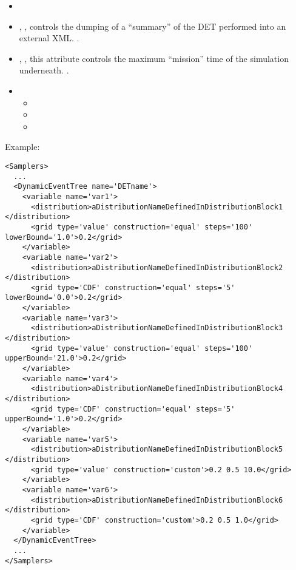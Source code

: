 %
\attrsIntro
\begin{itemize}
  \itemsep0em
  \item \nameDescription
  \item {}, ,
    controls the dumping of a ``summary'' of the DET performed into an external
    XML.
    .
  \item {}, , this
    attribute controls the maximum ``mission'' time of the simulation
    underneath.
    .
\end{itemize}
\begin{itemize}
\item \variableDescription
  \variableChildrenIntro
  \begin{itemize}
    \item \distributionDescription
    \item \functionDescription
    \item \gridDescription
  \end{itemize}
\end{itemize}

Example:
\begin{lstlisting}[style=XML]
<Samplers>
  ...
  <DynamicEventTree name='DETname'>
    <variable name='var1'>
      <distribution>aDistributionNameDefinedInDistributionBlock1 </distribution>
      <grid type='value' construction='equal' steps='100' lowerBound='1.0'>0.2</grid>
    </variable>
    <variable name='var2'>
      <distribution>aDistributionNameDefinedInDistributionBlock2 </distribution>
      <grid type='CDF' construction='equal' steps='5' lowerBound='0.0'>0.2</grid>
    </variable>
    <variable name='var3'>
      <distribution>aDistributionNameDefinedInDistributionBlock3 </distribution>
      <grid type='value' construction='equal' steps='100' upperBound='21.0'>0.2</grid>
    </variable>
    <variable name='var4'>
      <distribution>aDistributionNameDefinedInDistributionBlock4 </distribution>
      <grid type='CDF' construction='equal' steps='5' upperBound='1.0'>0.2</grid>
    </variable>
    <variable name='var5'>
      <distribution>aDistributionNameDefinedInDistributionBlock5 </distribution>
      <grid type='value' construction='custom'>0.2 0.5 10.0</grid>
    </variable>
    <variable name='var6'>
      <distribution>aDistributionNameDefinedInDistributionBlock6 </distribution>
      <grid type='CDF' construction='custom'>0.2 0.5 1.0</grid>
    </variable>
  </DynamicEventTree>
  ...
</Samplers>
\end{lstlisting}

